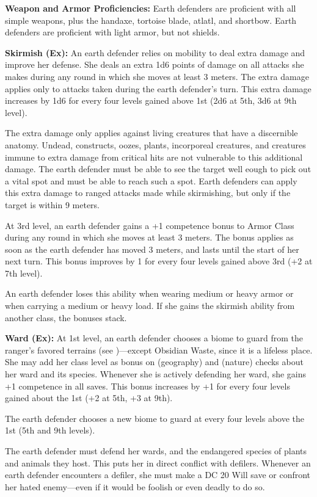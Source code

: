 {
\textbf{Weapon and Armor Proficiencies:} Earth defenders are proficient with all simple  weapons, plus the handaxe, tortoise blade, atlatl, and shortbow. Earth defenders are proficient with light armor, but not shields.

\textbf{Skirmish (Ex):} An earth defender relies on mobility to deal extra damage and improve her defense. She deals an extra 1d6 points of damage on all attacks she makes during any round in which she moves at least 3 meters. The extra damage applies only to attacks taken during the earth defender's turn. This extra damage increases by 1d6 for every four levels gained above 1st (2d6 at 5th, 3d6 at 9th level).

The extra damage only applies against living creatures that have a discernible anatomy. Undead, constructs, oozes, plants, incorporeal creatures, and creatures immune to extra damage from critical hits are not vulnerable to this additional damage. The earth defender must be able to see the target well eough to pick out a vital spot and must be able to reach such a spot. Earth defenders can apply this extra damage to ranged attacks made while skirmishing, but only if the target is within 9 meters.

At 3rd level, an earth defender gains a +1 competence bonus to Armor Class during any round in which she moves at least 3 meters. The bonus applies as soon as the earth defender has moved 3 meters, and lasts until the start of her next turn. This bonus improves by 1 for every four levels gained above 3rd (+2 at 7th level).

An earth defender loses this ability when wearing medium or heavy armor or when carrying a medium or heavy load. If she gains the skirmish ability from another class, the bonuses stack.

\textbf{Ward (Ex):} At 1st level, an earth defender chooses a biome to guard from the ranger's favored terrains (see )---except Obsidian Waste, since it is a lifeless place. She may add her class level as bonus on  (geography) and  (nature) checks about her ward and its species. Whenever she is actively defending her ward, she gains +1 competence in all saves. This bonus increases by +1 for every four levels gained about the 1st (+2 at 5th, +3 at 9th).

The earth defender chooses a new biome to guard at every four levels above the 1st (5th and 9th levels).

The earth defender must defend her wards, and the endangered species of plants and animals they host. This puts her in direct conflict with defilers. Whenever an earth defender encounters a defiler, she must make a DC 20 Will save or confront her hated enemy---even if it would be foolish or even deadly to do so.

}

